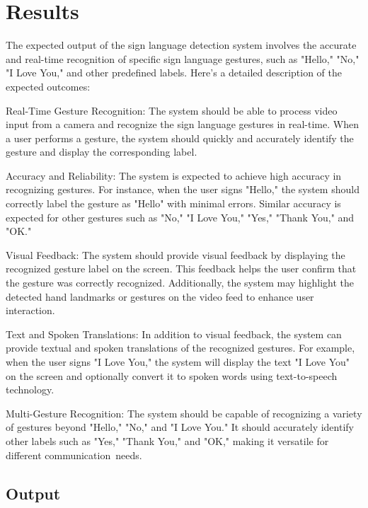 \chapter{Results }
The expected output of the sign language detection system involves the accurate and real-time recognition of specific sign language gestures, such as "Hello," "No," "I Love You," and other predefined labels. Here's a detailed description of the expected outcomes:

Real-Time Gesture Recognition:
The system should be able to process video input from a camera and recognize the sign language gestures in real-time. When a user performs a gesture, the system should quickly and accurately identify the gesture and display the corresponding label.

Accuracy and Reliability:
The system is expected to achieve high accuracy in recognizing gestures. For instance, when the user signs "Hello," the system should correctly label the gesture as "Hello" with minimal errors. Similar accuracy is expected for other gestures such as "No," "I Love You," "Yes," "Thank You," and "OK."

Visual Feedback:
The system should provide visual feedback by displaying the recognized gesture label on the screen. This feedback helps the user confirm that the gesture was correctly recognized. Additionally, the system may highlight the detected hand landmarks or gestures on the video feed to enhance user interaction.

Text and Spoken Translations:
In addition to visual feedback, the system can provide textual and spoken translations of the recognized gestures. For example, when the user signs "I Love You," the system will display the text "I Love You" on the screen and optionally convert it to spoken words using text-to-speech technology.

Multi-Gesture Recognition:
The system should be capable of recognizing a variety of gestures beyond "Hello," "No," and "I Love You." It should accurately identify other labels such as "Yes," "Thank You," and "OK," making it versatile for different communication needs.
\newpage

\section{Output}
